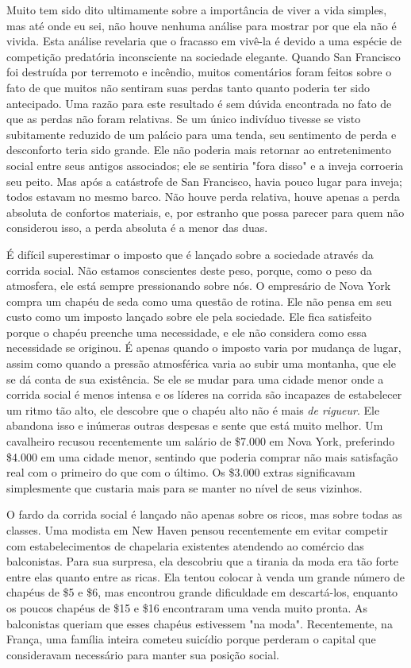\documentclass[12pt]{article}
\begin{document}
Muito tem sido dito ultimamente sobre a importância de viver a vida simples, mas até onde eu sei, não houve nenhuma análise para mostrar por que ela não é vivida. Esta análise revelaria que o fracasso em vivê-la é devido a uma espécie de competição predatória inconsciente na sociedade elegante. Quando San Francisco foi destruída por terremoto e incêndio, muitos comentários foram feitos sobre o fato de que muitos não sentiram suas perdas tanto quanto poderia ter sido antecipado. Uma razão para este resultado é sem dúvida encontrada no fato de que as perdas não foram relativas. Se um único indivíduo tivesse se visto subitamente reduzido de um palácio para uma tenda, seu sentimento de perda e desconforto teria sido grande. Ele não poderia mais retornar ao entretenimento social entre seus antigos associados; ele se sentiria "fora disso" e a inveja corroeria seu peito. Mas após a catástrofe de San Francisco, havia pouco lugar para inveja; todos estavam no mesmo barco. Não houve perda relativa, houve apenas a perda absoluta de confortos materiais, e, por estranho que possa parecer para quem não considerou isso, a perda absoluta é a menor das duas.

É difícil superestimar o imposto que é lançado sobre a sociedade através da corrida social. Não estamos conscientes deste peso, porque, como o peso da atmosfera, ele está sempre pressionando sobre nós. O empresário de Nova York compra um chapéu de seda como uma questão de rotina. Ele não pensa em seu custo como um imposto lançado sobre ele pela sociedade. Ele fica satisfeito porque o chapéu preenche uma necessidade, e ele não considera como essa necessidade se originou. É apenas quando o imposto varia por mudança de lugar, assim como quando a pressão atmosférica varia ao subir uma montanha, que ele se dá conta de sua existência. Se ele se mudar para uma cidade menor onde a corrida social é menos intensa e os líderes na corrida são incapazes de estabelecer um ritmo tão alto, ele descobre que o chapéu alto não é mais \textit{de rigueur}. Ele abandona isso e inúmeras outras despesas e sente que está muito melhor. Um cavalheiro recusou recentemente um salário de \$7.000 em Nova York, preferindo \$4.000 em uma cidade menor, sentindo que poderia comprar não mais satisfação real com o primeiro do que com o último. Os \$3.000 extras significavam simplesmente que custaria mais para se manter no nível de seus vizinhos.

O fardo da corrida social é lançado não apenas sobre os ricos, mas sobre todas as classes. Uma modista em New Haven pensou recentemente em evitar competir com estabelecimentos de chapelaria existentes atendendo ao comércio das balconistas. Para sua surpresa, ela descobriu que a tirania da moda era tão forte entre elas quanto entre as ricas. Ela tentou colocar à venda um grande número de chapéus de \$5 e \$6, mas encontrou grande dificuldade em descartá-los, enquanto os poucos chapéus de \$15 e \$16 encontraram uma venda muito pronta. As balconistas queriam que esses chapéus estivessem "na moda". Recentemente, na França, uma família inteira cometeu suicídio porque perderam o capital que consideravam necessário para manter sua posição social.
\end{document}
